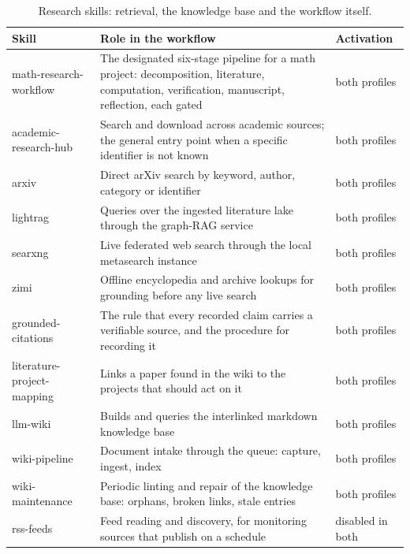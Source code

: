 \documentclass[10pt]{article}
\begin{document}
\begin{table}[htbp]
\centering\footnotesize
\caption{Research skills: retrieval, the knowledge base and the workflow itself.}\label{tab:skillsresearch1}
\renewcommand{\arraystretch}{1.15}
\begin{tabularx}{\textwidth}{@{}>{\raggedright\arraybackslash}p{3.5cm} X >{\raggedright\arraybackslash}p{2.3cm}@{}}
\toprule
\textbf{Skill} & \textbf{Role in the workflow} & \textbf{Activation} \\
\midrule
math-research-workflow & The designated six-stage pipeline for a math project: decomposition, literature, computation, verification, manuscript, reflection, each gated & both profiles \\
academic-research-hub & Search and download across academic sources; the general entry point when a specific identifier is not known & both profiles \\
arxiv & Direct arXiv search by keyword, author, category or identifier & both profiles \\
lightrag & Queries over the ingested literature lake through the graph-RAG service & both profiles \\
searxng & Live federated web search through the local metasearch instance & both profiles \\
zimi & Offline encyclopedia and archive lookups for grounding before any live search & both profiles \\
grounded-citations & The rule that every recorded claim carries a verifiable source, and the procedure for recording it & both profiles \\
literature-project-mapping & Links a paper found in the wiki to the projects that should act on it & both profiles \\
llm-wiki & Builds and queries the interlinked markdown knowledge base & both profiles \\
wiki-pipeline & Document intake through the queue: capture, ingest, index & both profiles \\
wiki-maintenance & Periodic linting and repair of the knowledge base: orphans, broken links, stale entries & both profiles \\
rss-feeds & Feed reading and discovery, for monitoring sources that publish on a schedule & disabled in both \\
\bottomrule
\end{tabularx}
\end{table}
\end{document}
